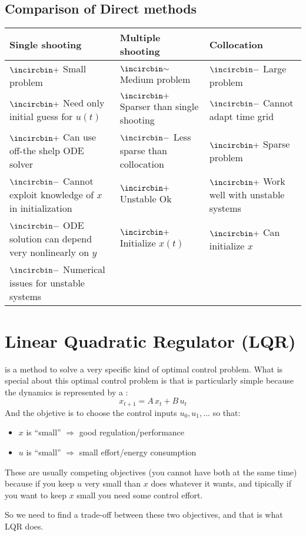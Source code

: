 \subsection{Comparison of Direct methods}
\begin{table}[!h]
\centering
\begin{tabularx}{\textwidth}{|X|X|X|}
\textbf{Single shooting} & \textbf{Multiple shooting} & \textbf{Collocation}\\
\hline
$\ooplus$ Small problem & $\oocirca$ Medium problem & $\oominus$ Large problem\\
$\ooplus$ Need only initial guess for $u(t)$ &$\ooplus$ Sparser than single shooting& $\oominus$ Cannot adapt time grid\\
$\ooplus$ Can use off-the shelp ODE solver &$\oominus$ Less sparse than collocation & $\ooplus$ Sparse problem\\
$\oominus$ Cannot exploit knowledge of $x$ in initialization & $\ooplus$ Unstable Ok &$\ooplus$ Work well with unstable systems\\
$\oominus$ ODE solution can depend very nonlinearly on $y$ & $\ooplus$ Initialize $x(t)$ & $\ooplus$ Can initialize $x$\\
$\oominus$ Numerical issues for unstable systems&&
\end{tabularx}
\end{table}
\section{Linear Quadratic Regulator (LQR)}
 is a method to solve a very specific kind of optimal control problem. What is special about this optimal control problem is that is  particularly simple because the dynamics is represented by a : 
\[x_{t+1} = A\,x_t + B\,u_t\]
And the objetive is to choose the control inputs $u_0, u_1, ...$ so that:
\begin{itemize}
\item $x$ is ``small'' $\Rightarrow$ good regulation/performance
\item $u$ is ``small'' $\Rightarrow$ small effort/energy consumption
\end{itemize}
These are usually competing objectives (you cannot have both at the same time) because if you keep $u$ very small than $x$ does whatever it wants, and tipically if you want to keep $x$ small you need some control effort.

So we need to find a trade-off between these two objectives, and that is what LQR does.

